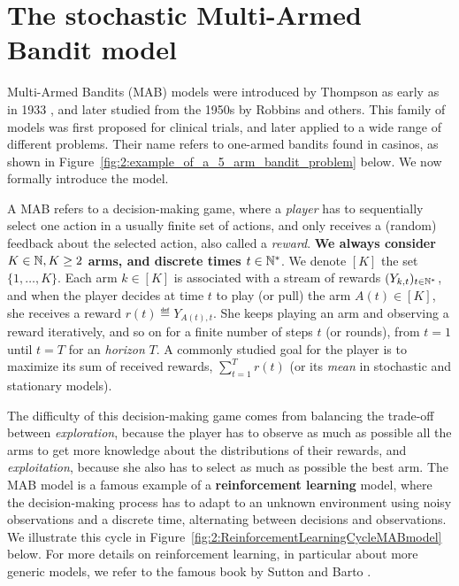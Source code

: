 

\section{The stochastic Multi-Armed Bandit model}
\label{sec:2:notations}


Multi-Armed Bandits (MAB) models were introduced by Thompson as early as in 1933 \cite{Thompson33}, and later studied from the 1950s by Robbins \cite{Robbins52} and others.
This family of models was first proposed for clinical trials, and later applied to a wide range of different problems.
Their name refers to one-armed bandits found in casinos, as shown in Figure~\ref{fig:2:example_of_a_5_arm_bandit_problem} below.
%
We now formally introduce the model.

A MAB refers to a decision-making game, where a \emph{player} has to sequentially select one action in a usually finite set of actions, and only receives a (random) feedback about the selected action, also called a \emph{reward}.
\textbf{We always consider $K\in\mathbb{N}, K\geq2$ arms, and discrete times $t\in\mathbb{N}^*$}.
We denote $[K]$ the set $\{1,\dots,K\}$.
Each arm $k\in[K]$ is associated with a stream of rewards $(Y_{k,t})_{t\in\mathbb{N}^*}$,
and when the player decides at time $t$ to play (or pull) the arm $A(t)\in[K]$,
she receives a reward $r(t) \eqdef Y_{A(t),t}$.
She keeps playing an arm and observing a reward iteratively, and so on for a finite number of steps $t$ (or rounds), from $t=1$ until $t=T$ for an \emph{horizon} $T$.
%
A commonly studied goal for the player is to maximize its sum of received rewards, $\sum_{t=1}^T r(t)$
(or its \emph{mean} in stochastic and stationary models).


The difficulty of this decision-making game comes from balancing the trade-off between \emph{exploration}, because the player has to observe as much as possible all the arms to get more knowledge about the distributions of their rewards, and \emph{exploitation}, because she also has to select as much as possible the best arm.
The MAB model is a famous example of a \textbf{reinforcement learning} model, where the decision-making process has to adapt to an unknown environment using noisy observations and a discrete time, alternating between decisions and observations.
We illustrate this cycle in Figure~\ref{fig:2:ReinforcementLearningCycleMABmodel} below.
For more details on reinforcement learning, in particular about more generic models, we refer to the famous book by Sutton and Barto \cite{SuttonBarto2018}.


